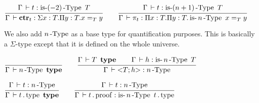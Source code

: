 \documentclass[a4paper,english]{lipics-utf8x}
\begin{document}
  \begin{center}
  \(
    \ru{\Gamma \der t : \isnType{(-2)}{T}
      }{\Gamma \der \ctr_t : \Sigma x:T. \Pi y:T. x =_T y}
    \qquad
    \ru{\Gamma \der t : \isnType{(n+1)}{T}
      }{\Gamma \der \pi_t : \Pi x:T. \Pi y:T. \isnType{n}{x =_T y}}
  \)
  \end{center}

  We also add $n\operatorname{-Type}$ as a base type for quantification
  purposes. This is basically a $\Sigma$-type except that it is
  defined on the whole universe.

  \begin{center}
  \(
    \ru{}{\Gamma \der \nType{n} \type}
    \qquad
    \ru{\Gamma \der T \type \qquad
        \Gamma \der h : \isnType{n}{T}
      }{\Gamma \der {<} T ; h {>} : \nType{n}}
  \)
  \end{center}

  \begin{center}
  \(
    \ru{\Gamma \der t : \nType{n}
      }{\Gamma \der t \gettype \type}
    \qquad
    \ru{\Gamma \der t : \nType{n}
      }{\Gamma \der t \getproof : \isnType{n}{t \gettype}}
  \)
  \end{center}


%
%
\end{document}
